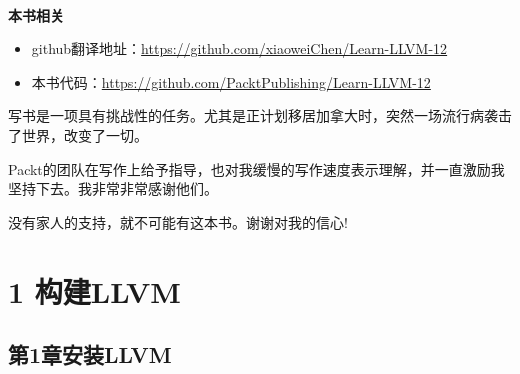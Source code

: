 \documentclass[11pt,a4paper,UTF8]{ctexart}
\begin{document}
	
	\hspace*{\fill} \\ %
	\noindent\textbf{本书相关}\ \par
	\begin{itemize}
		\item github翻译地址：\url{https://github.com/xiaoweiChen/Learn-LLVM-12}
		\item 本书代码：\url{https://github.com/PacktPublishing/Learn-LLVM-12}
	\end{itemize}
	\newpage
	
	
	\begin{center}
		\vspace*{\fill}
		写书是一项具有挑战性的任务。尤其是正计划移居加拿大时，突然一场流行病袭击了世界，改变了一切。\par
		
		\hspace*{\fill} \par
		
		Packt的团队在写作上给予指导，也对我缓慢的写作速度表示理解，并一直激励我坚持下去。我非常非常感谢他们。\par
		
		\hspace*{\fill} \par
		
		没有家人的支持，就不可能有这本书。谢谢对我的信心!\par
		
		\vspace*{\fill}
	\end{center}
	
	\newpage
	
	\pagestyle{empty}
	
	
	\tableofcontents
	\newpage
	
	
	\color{white}
	\section*{ 1 构建LLVM}
	\pagecolor{mygray}
	
	\color{black}
	\pagecolor{white}
	
	\subsection*{ 第1章\hspace{0.5cm}安装LLVM}
	
	
\end{document}
